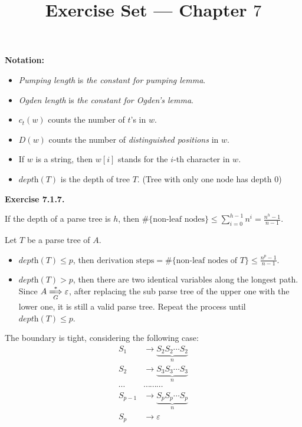 \documentclass[a4paper]{article}
\title{Exercise Set --- Chapter $7$}
\date{}
\newenvironment{exercise}[1]{
	\par
	\noindent\textbf{Exercise #1.}\quad
}{
	\par
	\bigskip
}
\begin{document}
\maketitle

\noindent\textbf{Notation:}
\begin{itemize}
\item \textit{Pumping length} is \textit{the constant for pumping lemma}.
\item \textit{Ogden length} is \textit{the constant for Ogden's lemma}.
\item $c_t(w)$ counts the number of $t$'s in $w$.
\item $D(w)$ counts the number of \textit{distinguished positions} in $w$.
\item If $w$ is a string, then $w[i]$ stands for the $i$-th character in $w$.
\item $\textit{depth}(T)$ is the depth of tree $T$. (Tree with only one node has depth $0$)
\end{itemize}

\begin{exercise}{7.1.7}
    If the depth of a parse tree is $h$, then $\#\{\text{non-leaf nodes}\}\leqslant
    \sum_{i=0}^{h-1} n^i=\frac{n^h-1}{n-1}.$\par
    Let $T$ be a parse tree of $A$.
    \begin{itemize}
        \item $\textit{depth}(T)\leqslant p$, then
            $\text{derivation steps}=\#\{\text{non-leaf nodes of }T\}\leqslant\frac{n^p-1}{n-1}$.
        \item $\textit{depth}(T)>p$, then there are two identical
            variables along the longest path. Since $A\xLongrightarrow[G]{*}\varepsilon$,
            after replacing the sub parse tree of the upper one with the lower one,
            it is still a valid parse tree.
            Repeat the process until $\textit{depth}(T)\leqslant p$.
    \end{itemize}
    The boundary is tight, considering the following case:
    \small
    \begin{align*}
        S_1 &\to \underbrace{S_2S_2\cdots S_2}_{n}\\
        S_2 &\to \underbrace{S_3S_3\cdots S_3}_{n}\\
        \cdots&\cdots\cdots\cdots\\
        S_{p-1} &\to \underbrace{S_pS_p\cdots S_p}_{n}\\
        S_{p} &\to \varepsilon
    \end{align*}
\end{exercise}
\end{document}
